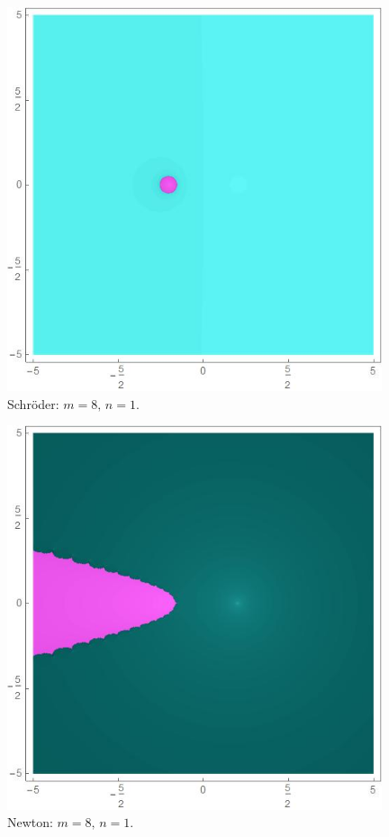 \begin{figure}[H]
\vspace{0.5cm}

\begin{minipage}[t]{0.45\textwidth}
\centering
\includegraphics[width=0.98\textwidth]{fuentes/articulo-cuadraticos/imagenes/sch_m_8n_1.jpg}
\small Schröder: $m=8, \, n=1.$
\end{minipage}\hfill
\begin{minipage}[t]{0.45\textwidth}
\centering
\includegraphics[width=0.98\textwidth]{fuentes/articulo-cuadraticos/imagenes/newton_m_8n_1.jpg}
\small Newton: $m=8, \, n=1.$
\end{minipage}


\end{figure}
